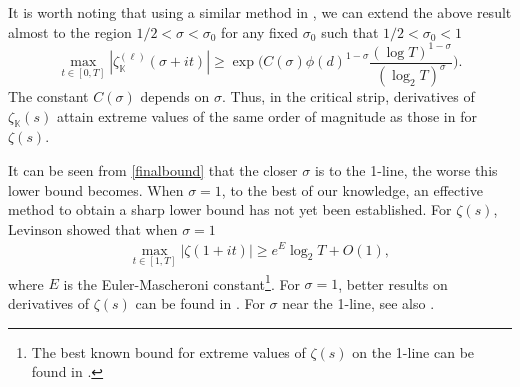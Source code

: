 \documentclass[12pt,reqno]{amsart}
\theoremstyle{definition}
\numberwithin{equation}{section}
\newcommand{\mbk}{\mathbb{K}}
\begin{document}
\par
It is worth noting that using a similar method in \cite{bondarenko2018note}, we can extend the above result almost to the region $1/2 < \sigma < \sigma_0$ for any fixed $\sigma_0$ such that $1/2<\sigma_0<1$
\begin{equation}
    \label{finalbound}
        \max_{t\in[0,T]}|\zeta_\mbk^{(\ell)}(\sigma+it)|\ge \exp\bigg(C(\sigma) \phi(d)^{1-\sigma}\frac{(\log T)^{1-\sigma}}{(\log_2 T)^{\sigma}}\bigg).
\end{equation}
The constant $C(\sigma)$ depends on $\sigma$. Thus, in the critical strip, derivatives of $\zeta_\mbk(s)$ attain extreme values of the same order of magnitude as those in \cite[Theorem 2.(B)]{yang2022extreme} for $\zeta(s)$.
\par
It can be seen from \eqref{finalbound} that the closer $\sigma$ is to the 1-line, the worse this lower bound becomes. When $\sigma = 1$, to the best of our knowledge, an effective method to obtain a sharp lower bound has not yet been established. For $\zeta(s)$, Levinson \cite{levinson2017Omega} showed that when $\sigma=1$
\begin{align*}
 \max_{t\in[1,T]} |\zeta(1+it)| \ge e^E \log_2 T +O(1), 
\end{align*}
where $E$ is the Euler-Mascheroni constant\footnote{The best known bound for extreme values of $\zeta(s)$ on the 1-line can be found in \cite{aistleitner2019extreme}.}. For $\sigma=1$, better results on derivatives of $\zeta(s)$ can be found in \cite{yang2024extreme}. For $\sigma$ near the 1-line, see also \cite{dong2023Onde}. 

\appendix
\end{document}
